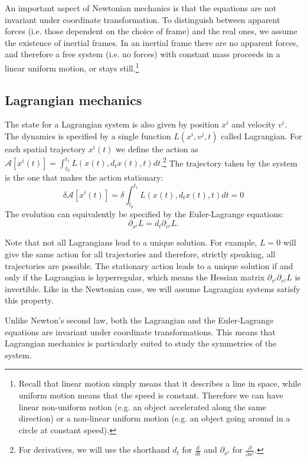 An important aspect of Newtonian mechanics is that the equations are not invariant under coordinate transformation. To distinguish between apparent forces (i.e. those dependent on the choice of frame) and the real ones, we assume the existence of inertial frames. In an inertial frame there are no apparent forces, and therefore a free system (i.e. no forces) with constant mass proceeds in a linear uniform motion, or stays still.\footnote{Recall that linear motion simply means that it describes a line in space, while uniform motion means that the speed is constant. Therefore we can have linear non-uniform notion (e.g. an object accelerated along the same direction) or a non-linear uniform motion (e.g. an object going around in a circle at constant speed).}

\subsection{Lagrangian mechanics}

The state for a Lagrangian system is also given by position $x^i$ and velocity $v^i$. The dynamics is specified by a single function $L(x^i, v^j, t)$ called Lagrangian. For each spatial trajectory $x^i(t)$ we define the action as $\mathcal{A}[x^i(t)] = \int_{t_0}^{t_1} L(x(t), d_t x(t), t) dt$.\footnote{For derivatives, we will use the shorthand $d_t$ for $\frac{d}{dt}$ and $\partial_{x^i}$ for $\frac{\partial}{\partial x^i}$. } The trajectory taken by the system is the one that makes the action stationary:
\begin{equation}
\delta \mathcal{A}[x^i(t)] = \delta \int_{t_0}^{t_1} L\left(x(t), d_t x(t), t\right) dt=0
\end{equation}
The evolution can equivalently be specified by the Euler-Lagrange equations:
\begin{equation}\label{rp-cm-EulerLagrange}
	\partial_{x^i}L=d_t \partial_{v^i} L.
\end{equation}

Note that not all Lagrangians lead to a unique solution. For example, $L=0$ will give the same action for all trajectories and therefore, strictly speaking, all trajectories are possible. The stationary action leads to a unique solution if and only if the Lagrangian is hyperregular, which means the Hessian matrix $\partial_{v^i}\partial_{v^j} L$ is invertible. Like in the Newtonian case, we will assume Lagrangian systems satisfy this property.

Unlike Newton's second law, both the Lagrangian and the Euler-Lagrange equations are invariant under coordinate transformations. This means that Lagrangian mechanics is particularly suited to study the symmetries of the system.

